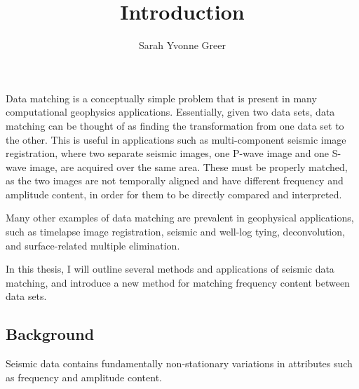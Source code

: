 \title{Introduction}
\author{Sarah Yvonne Greer}
\maketitle

Data matching is a conceptually simple problem that is present in many computational geophysics applications. 
Essentially, given two data sets, data matching can be thought of as finding the transformation from one data set to the other. 
This is useful in applications such as multi-component seismic image registration, where two separate seismic images, one P-wave image and one S- wave image, are acquired over the same area. 
These must be properly matched, as the two images are not temporally aligned and have different frequency and amplitude content, in order for them to be directly compared and interpreted. 

Many other examples of data matching are prevalent in geophysical applications, such as timelapse image registration, seismic and well-log tying, deconvolution, and surface-related multiple elimination.

In this thesis, I will outline several methods and applications of seismic data matching, and introduce a new method for matching frequency content between data sets.


\subsection{Background}
Seismic data contains fundamentally non-stationary variations in attributes such as frequency and amplitude content.
